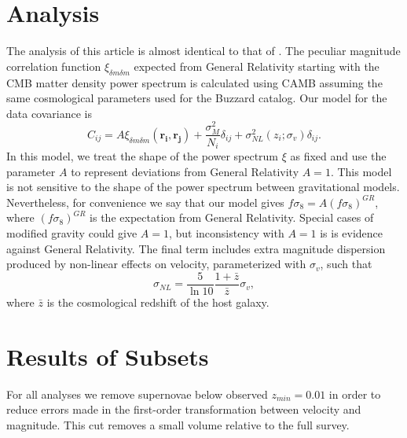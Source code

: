 \documentclass{aastex62}   	%
\begin{document}
\section{Analysis}
The analysis of this article is  almost identical to that of \citet{2015JCAP...12..033H, 2017JCAP...05..015H}.   The peculiar magnitude correlation
function $\xi_{\delta m \delta m}$ expected from General Relativity starting with the CMB
matter density power spectrum is calculated using CAMB \citep{Lewis:2002ah}  assuming the same
cosmological parameters used for the Buzzard catalog.  Our model for the data covariance
is
\begin{equation}
C_{ij} = A\xi_{\delta m \delta m}(\mathbf{r_i},\mathbf{r_j}) + \frac{\sigma_M^2}{N_i} \delta_{ij} + \sigma^2_{NL}(z_i;\sigma_{v})\delta_{ij}.
\end{equation}
In this model, we treat the shape of the power spectrum $\xi$ as fixed and use the parameter $A$ to represent
deviations from General Relativity $A=1$.  This model is not sensitive to  the shape of
the power spectrum between gravitational models.  Nevertheless, for
convenience we say that our model gives $f\sigma_8 = A (f\sigma_8)^{GR}$, where $(f\sigma_8)^{GR}$ is the expectation
from General Relativity.  Special cases of modified gravity could give $A=1$, but inconsistency with $A=1$ is is evidence against General Relativity.
The final term includes extra magnitude dispersion produced by non-linear effects on velocity, parameterized with $\sigma_{v}$, such that
\begin{equation}
\sigma_{NL} = \frac{5}{\ln{10}} \frac{1+\bar{z}}{\bar{z}} \sigma_v,
\end{equation}
where $\bar{z}$ is the cosmological redshift of the host galaxy.
\section{Results of Subsets}

For all analyses we remove supernovae below observed $z_{min}=0.01$ in order to
reduce errors made in the first-order transformation between velocity and
magnitude.  This cut removes a  small volume relative to the full survey.
\end{document}
